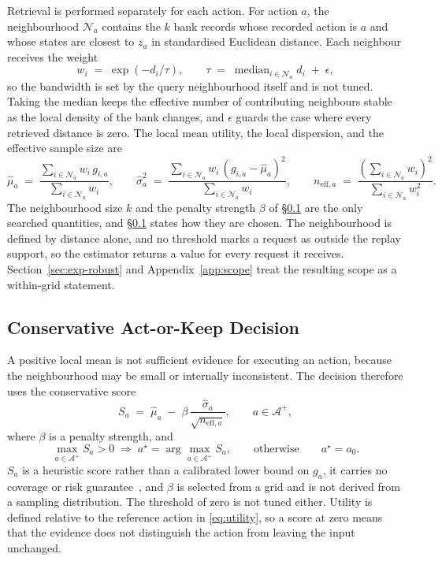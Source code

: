 \documentclass{article}
\newcommand{\calA}{\mathcal{A}}
\newcommand{\calN}{\mathcal{N}}
\begin{document}
Retrieval is performed separately for each action. For action $a$, the neighbourhood
$\calN_a$ contains the $k$ bank records whose recorded action is $a$ and whose states are
closest to $z_a$ in standardised Euclidean distance. Each neighbour receives the weight
\begin{equation}
  w_i \;=\; \exp\!\left(-d_i / \tau\right),
  \qquad
  \tau \;=\; \operatorname{median}_{i \in \calN_a} d_i \;+\; \epsilon ,
  \label{eq:weights}
\end{equation}
so the bandwidth is set by the query neighbourhood itself and is not tuned. Taking the median
keeps the effective number of contributing neighbours stable as the local density of the bank
changes, and $\epsilon$ guards the case where every retrieved distance is zero. The local mean
utility, the local dispersion, and the effective sample size are
\begin{equation}
  \hat\mu_a \;=\; \frac{\sum_{i \in \calN_a} w_i\, g_{i,a}}{\sum_{i \in \calN_a} w_i},
  \qquad
  \hat\sigma_a^{2} \;=\; \frac{\sum_{i \in \calN_a} w_i\, (g_{i,a} - \hat\mu_a)^{2}}{\sum_{i \in \calN_a} w_i},
  \qquad
  n_{\mathrm{eff},a} \;=\; \frac{\left(\sum_{i \in \calN_a} w_i\right)^{2}}{\sum_{i \in \calN_a} w_i^{2}} .
  \label{eq:local-moments}
\end{equation}
The neighbourhood size $k$ and the penalty strength $\beta$ of \S\ref{sec:method-decision} are
the only searched quantities, and \S\ref{sec:method-decision} states how they are chosen. The
neighbourhood is defined by distance alone, and no threshold marks a request as outside the
replay support, so the estimator returns a value for every request it receives.
Section~\ref{sec:exp-robust} and Appendix~\ref{app:scope} treat the resulting scope as a
within-grid statement.

\subsection{Conservative Act-or-Keep Decision}
\label{sec:method-decision}
A positive local mean is not sufficient evidence for executing an action, because the
neighbourhood may be small or internally inconsistent. The decision therefore uses the
conservative score
\begin{equation}
  S_a \;=\; \hat\mu_a \;-\; \beta\, \frac{\hat\sigma_a}{\sqrt{n_{\mathrm{eff},a}}},
  \qquad a \in \calA^{+},
  \label{eq:score}
\end{equation}
where $\beta$ is a penalty strength, and
\begin{equation}
  \max_{a \in \calA^{+}} S_a > 0
  \;\Rightarrow\;
  a^{\star} = \arg\max_{a \in \calA^{+}} S_a ,
  \qquad\text{otherwise}\qquad
  a^{\star} = a_0 .
  \label{eq:decision}
\end{equation}
$S_a$ is a heuristic score rather than a calibrated lower bound on $g_a$, it carries no
coverage or risk guarantee~\citep{angelopoulos2024conformal}, and $\beta$ is selected from a
grid and is not derived from a sampling distribution. The threshold of zero is not tuned
either.
Utility is defined relative to the reference action in \eqref{eq:utility}, so a score at zero
means that the evidence does not distinguish the action from leaving the input unchanged.
\end{document}
